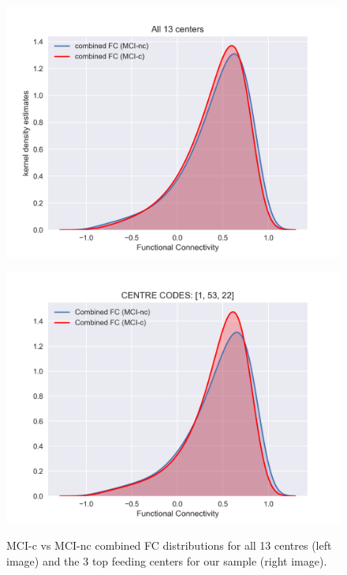 \documentclass[a4paper,12pt]{elsarticle}  %
\begin{document}
		\begin{figure}[h]
			\centering
			\begin{minipage}{.5\textwidth}
				\centering
				\includegraphics[width=1\linewidth]{fig_distFC_mitjana_TOTS_els_13centres.png}
				\label{tots_els_centres_FC}
			\end{minipage}%
			\begin{minipage}{.5\textwidth}
				\centering
				\includegraphics[width=1\linewidth]{fig_distFC_mitjana_centres___1,_53,_22__.png}
				\label{els3centres_FC}
			\end{minipage}
			\caption{MCI-c vs MCI-nc combined FC distributions for all 13 centres (left image) and the 3 top feeding centers for our sample (right image).}
			\label{FC_dist__tots_els_centres_i_3_top_feeding_centers}
		\end{figure}
\end{document}
